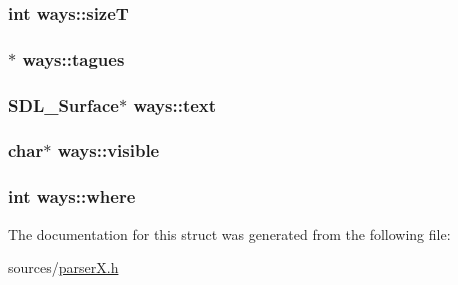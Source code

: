 \hypertarget{structways_a1205c87ee82c834f29135381991e5070}{
\subsubsection[{size\-T}]{\setlength{\rightskip}{0pt plus 5cm}int ways\-::size\-T}}\label{structways_a1205c87ee82c834f29135381991e5070}
\hypertarget{structways_a789ab9774dfad06f39c0b214a54525f5}{
\subsubsection[{tagues}]{$\ast$ ways\-::tagues}}\label{structways_a789ab9774dfad06f39c0b214a54525f5}
\hypertarget{structways_a6f4b44b77c63fe852b01f117647fae5e}{
\subsubsection[{text}]{\setlength{\rightskip}{0pt plus 5cm}S\-D\-L\-\_\-\-Surface$\ast$ ways\-::text}}\label{structways_a6f4b44b77c63fe852b01f117647fae5e}
\hypertarget{structways_ad404ba6377810c5470ee3c2dd40f62bd}{
\subsubsection[{visible}]{\setlength{\rightskip}{0pt plus 5cm}char$\ast$ ways\-::visible}}\label{structways_ad404ba6377810c5470ee3c2dd40f62bd}
\hypertarget{structways_aeab0f5f4b7024e1c4070f2b4551ac656}{
\subsubsection[{where}]{\setlength{\rightskip}{0pt plus 5cm}int ways\-::where}}\label{structways_aeab0f5f4b7024e1c4070f2b4551ac656}


The documentation for this struct was generated from the following file\-:\begin{DoxyCompactItemize}
\item 
sources/\hyperlink{parser_x_8h}{parser\-X.\-h}\end{DoxyCompactItemize}
